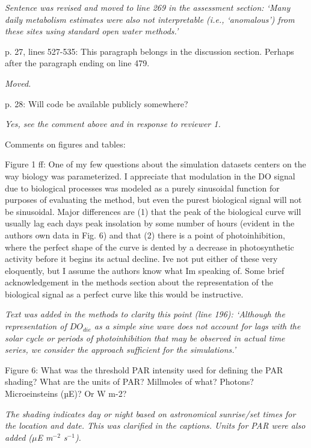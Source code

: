 \documentclass[letterpaper,12pt]{article}\usepackage[]{graphicx}\usepackage[]{color}
\begin{document}
{\it Sentence was revised and moved to line 269 in the assessment section: `Many daily metabolism estimates were also not interpretable (i.e., `anomalous') from these sites using standard open water methods.'
}

p. 27, lines 527-535: This paragraph belongs in the discussion section. Perhaps after the paragraph ending on line 479.

{\it Moved.} 

p. 28: Will code be available publicly somewhere?

{\it Yes, see the comment above and in response to reviewer 1.}

Comments on figures and tables:

Figure 1 ff: One of my few questions about the simulation datasets centers on the way biology was parameterized. I appreciate that modulation in the DO signal due to biological processes was modeled as a purely sinusoidal function for purposes of evaluating the method, but even the purest biological signal will not be sinusoidal. Major differences are (1) that the peak of the biological curve will usually lag each days peak insolation by some number of hours (evident in the authors own data in Fig. 6) and that (2) there is a point of photoinhibition, where the perfect shape of the curve is dented by a decrease in photosynthetic activity before it begins its actual decline. Ive not put either of these very eloquently, but I assume the authors know what Im speaking of. Some brief acknowledgement in the methods section about the representation of the biological signal as a perfect curve like this would be instructive.

{\it Text was added in the methods to clarity this point (line 196): `Although the representation of $DO_{die}$ as a simple sine wave does not account for lags with the solar cycle or periods of photoinhibition that may be observed in actual time series, we consider the approach sufficient for the simulations.'}

Figure 6: What was the threshold PAR intensity used for defining the PAR shading? What are the units of PAR? Millmoles of what? Photons? Microeinsteins (µE)? Or W m-2?

{\it The shading indicates day or night based on astronomical sunrise/set times for the location and date.  This was clarified in the captions.  Units for PAR were also added ($\mu$E m$^{-2}$ s$^{-1}$).}
 
\end{document}
